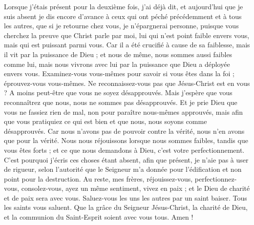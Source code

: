 \begin{multicols}{2}
Lorsque j’étais présent pour la deuxième fois, j’ai déjà dit, et aujourd’hui que je suis absent je dis encore d’avance à ceux qui ont péché précédemment et à tous les autres, que si je retourne chez vous, je n'épargnerai personne,
puisque vous cherchez la preuve que Christ parle par moi, lui qui n'est point faible envers vous, mais qui est puissant parmi vous.
Car il a été crucifié à cause de sa faiblesse, mais il vit par la puissance de Dieu ; et nous de même, nous sommes aussi faibles comme lui, mais nous vivrons avec lui par la puissance que Dieu a déployée envers vous.
Examinez-vous vous-mêmes pour savoir si vous êtes dans la foi ; éprouvez-vous vous-mêmes. Ne reconnaissez-vous pas que Jésus-Christ est en vous ? A moins peut-être que vous ne soyez désapprouvés.
Mais j'espère que vous reconnaîtrez que nous, nous ne sommes pas désapprouvés.
Et je prie Dieu que vous ne fassiez rien de mal, non pour paraître nous-mêmes approuvés, mais afin que vous pratiquiez ce qui est bien et que nous, nous soyons comme désapprouvés.
Car nous n’avons pas de pouvoir contre la vérité, nous n’en avons que pour la vérité.
Nous nous réjouissons lorsque nous sommes faibles, tandis que vous êtes forts ; et ce que nous demandons à Dieu, c’est votre perfectionnement.
C'est pourquoi j'écris ces choses étant absent, afin que présent, je n’aie pas à user de rigueur, selon l’autorité que le Seigneur m'a donnée pour l'édification et non point pour la destruction.
Au reste, mes frères, réjouissez-vous, perfectionnez-vous, consolez-vous, ayez un même sentiment, vivez en paix ; et le Dieu de charité et de paix sera avec vous.
Saluez-vous les uns les autres par un saint baiser. Tous les saints vous saluent.
Que la grâce du Seigneur Jésus-Christ, la charité de Dieu, et la communion du Saint-Esprit soient avec vous tous. Amen !
\PPE{}
\end{multicols}
